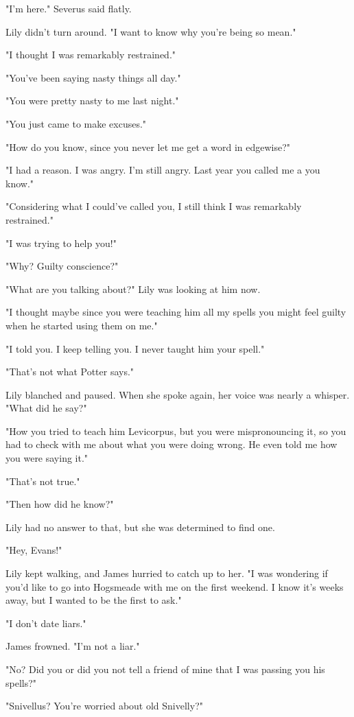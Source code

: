 "I'm here." Severus said flatly.

Lily didn't turn around. "I want to know why you're being so mean."

"I thought I was remarkably restrained."

"You've been saying nasty things all day."

"You were pretty nasty to me last night."

"You just came to make excuses."

"How do you know, since you never let me get a word in edgewise?"

"I had a reason. I was angry. I'm still angry. Last year you called me a{\el} you know."

"Considering what I could've called you, I still think I was remarkably restrained."

"I was trying to help you!"

"Why? Guilty conscience?"

"What are you talking about?" Lily was looking at him now.

"I thought maybe since you were teaching him all my spells you might feel guilty when he started using them on me."

"I told you. I keep telling you. I never taught him your spell."

"That's not what Potter says."

Lily blanched and paused. When she spoke again, her voice was nearly a whisper. "What did he say?"

"How you tried to teach him Levicorpus, but you were mispronouncing it, so you had to check with me about what you were doing wrong. He even told me how you were saying it."

"That's not true."

"Then how did he know?"

Lily had no answer to that, but she was determined to find one.

"Hey, Evans!"

Lily kept walking, and James hurried to catch up to her. "I was wondering if you'd like to go into Hogsmeade with me on the first weekend. I know it's weeks away, but I wanted to be the first to ask."

"I don't date liars."

James frowned. "I'm not a liar."

"No? Did you or did you not tell a friend of mine that I was passing you his spells?"

"Snivellus? You're worried about old Snivelly?"


